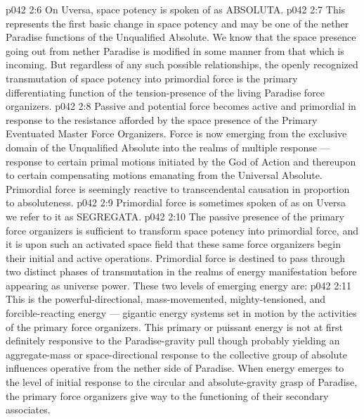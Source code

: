 \vs p042 2:6 On Uversa, space potency is spoken of as ABSOLUTA.
\vs p042 2:7 \bibnobreakspace {} This represents the first basic change in space potency and may be one of the nether Paradise functions of the Unqualified Absolute. We know that the space presence going out from nether Paradise is modified in some manner from that which is incoming. But regardless of any such possible relationships, the openly recognized transmutation of space potency into primordial force is the primary differentiating function of the tension\hyp{}presence of the living Paradise force organizers.
\vs p042 2:8 Passive and potential force becomes active and primordial in response to the resistance afforded by the space presence of the Primary Eventuated Master Force Organizers. Force is now emerging from the exclusive domain of the Unqualified Absolute into the realms of multiple response --- response to certain primal motions initiated by the God of Action and thereupon to certain compensating motions emanating from the Universal Absolute. Primordial force is seemingly reactive to transcendental causation in proportion to absoluteness.
\vs p042 2:9 Primordial force is sometimes spoken of as  on Uversa we refer to it as SEGREGATA.
\vs p042 2:10 \bibnobreakspace {} The passive presence of the primary force organizers is sufficient to transform space potency into primordial force, and it is upon such an activated space field that these same force organizers begin their initial and active operations. Primordial force is destined to pass through two distinct phases of transmutation in the realms of energy manifestation before appearing as universe power. These two levels of emerging energy are:
\vs p042 2:11 \bibnobreakspace {} This is the powerful\hyp{}directional, mass\hyp{}movemented, mighty\hyp{}tensioned, and forcible\hyp{}reacting energy --- gigantic energy systems set in motion by the activities of the primary force organizers. This primary or puissant energy is not at first definitely responsive to the Paradise\hyp{}gravity pull though probably yielding an aggregate\hyp{}mass or space\hyp{}directional response to the collective group of absolute influences operative from the nether side of Paradise. When energy emerges to the level of initial response to the circular and absolute\hyp{}gravity grasp of Paradise, the primary force organizers give way to the functioning of their secondary associates.
